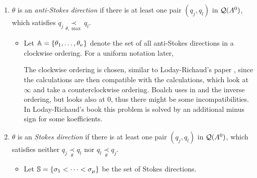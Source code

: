 \begin{defn}\label{defn:antiStokesDir}
  \begin{enumerate}
    \item $\theta$ is an \emph{anti-Stokes direction} if there is at least one
      pair $(q_j,q_l)$ in $\cQ(A^0)$, which satisfies
      $q_j \underset{\theta,\max}{\prec} q_l$.
      \begin{itemize}
        \item Let $\A=\{\theta_1,\dots,\theta_{\nu}\}$ denote the set of all
          anti-Stokes directions in a clockwise ordering. For a uniform
          notation later, 
          \begin{s-rem}
            The clockwise ordering is chosen, similar to Loday-Richaud's paper
            \cite{Loday1994}, since the calculations are then compatible with
            the calculations, which look at $\infty$ and take a
            counterclockwise ordering.
            Boalch uses in \cite{boalch} and \cite{thboalch} the inverse
            ordering, but looks also at $0$, thus there might be some
            incompatibilities.
            In Loday-Richaud's book \cite{Loday2014} this problem is solved by
            an additional minus sign for some koefficients.
          \end{s-rem}
      \end{itemize}
    \item $\theta$ is an \emph{Stokes direction} if there is at least one pair
      $(q_j,q_l)$ in $\cQ(A^0)$, which satisfies neither
      $q_j\underset{\theta}{\prec} q_l$ nor $q_l\underset{\theta}{\prec} q_j$.
      \begin{itemize}
        \item Let $\S=\{\sigma_1<\cdots<\sigma_\mu\}$ be the set of Stokes
          directions.
      \end{itemize}
  \end{enumerate}
\end{defn}

